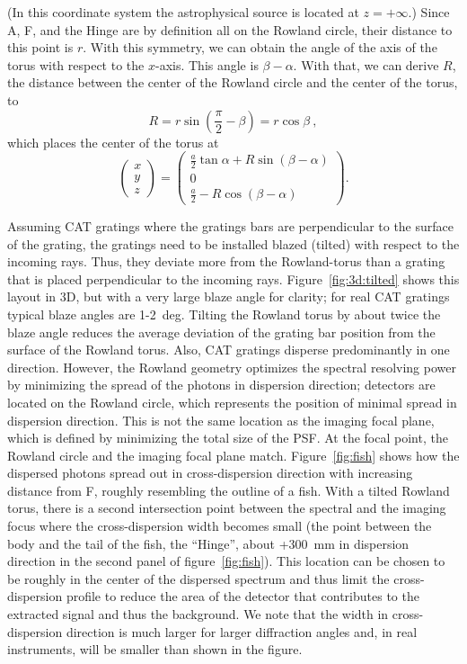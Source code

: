 \documentclass[linenumbers]{aastex631}
\begin{document}
(In this coordinate system the astrophysical source is located at $z=+\infty$.)
Since A, F, and the Hinge are by definition all on the Rowland circle, their distance to this point is $r$. With this symmetry, we can obtain the angle of the axis of the torus with respect to the $x$-axis. This angle is $\beta-\alpha$. With that, we can derive $R$, the distance between the center of the Rowland circle and the center of the torus, to
\begin{equation}
    R = r \sin\left(\frac{\pi}{2} - \beta\right) = r \cos\beta\ ,
\end{equation}
which places the center of the torus at
\begin{equation}
    \begin{pmatrix} x \\ y \\ z \end{pmatrix} =
    \begin{pmatrix} \frac{a}{2}\tan{\alpha}+R\sin{(\beta-\alpha)} \\ 0 \\
        \frac{a}{2}-R\cos{(\beta-\alpha)} \end{pmatrix}.
\end{equation}

Assuming CAT gratings where the gratings bars are perpendicular to the surface of the grating, the gratings need to be installed blazed (tilted) with respect to the incoming rays. Thus, they deviate more from the Rowland-torus than a grating that is placed perpendicular to the incoming rays. Figure~\ref{fig:3d:tilted} shows this layout in 3D, but with a very large blaze angle for clarity; for real CAT gratings typical blaze angles are 1-2~deg. Tilting the Rowland torus by about twice the blaze angle reduces the average deviation of the grating bar position from the surface of the Rowland torus. Also, CAT gratings disperse predominantly in one direction. However, the Rowland geometry optimizes the spectral resolving power by minimizing the spread of the photons in dispersion direction; detectors are located on the Rowland circle, which represents the position of minimal spread in dispersion direction. This is not the same location as the imaging focal plane, which is defined by minimizing the total size of the PSF. At the focal point, the Rowland circle and the imaging focal plane match. Figure~\ref{fig:fish} shows how the dispersed photons spread out in cross-dispersion direction with increasing distance from F, roughly resembling the outline of a fish. With a tilted Rowland torus, there is a second intersection point between the spectral and the imaging focus where the cross-dispersion width becomes small (the point between the body and the tail of the fish, the ``Hinge'', about +300~mm in dispersion direction in the second panel of figure~\ref{fig:fish}). This location can be chosen to be roughly in the center of the dispersed spectrum and thus limit the cross-dispersion profile to reduce the area of the detector that contributes to the extracted signal and thus the background. We note that the width in cross-dispersion direction is much larger for larger diffraction angles and, in real instruments, will be smaller than shown in the figure.
\end{document}
